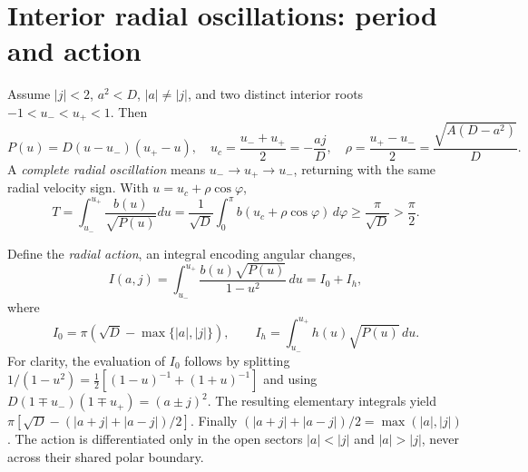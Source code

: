 \documentclass[11pt,a4paper]{article}
\theoremstyle{remark}\newtheorem{remark}[theorem]{Remark}
\begin{document}
\section{Interior radial oscillations: period and action}
Assume $|j|<2$, $a^2<D$, $|a|\ne|j|$, and two distinct interior roots $-1<u_-<u_+<1$. Then
\begin{equation}\label{eq:turning}
P(u)=D(u-u_-)(u_+-u),\quad u_c=\frac{u_-+u_+}{2}=-\frac{aj}{D},\quad \rho=\frac{u_+-u_-}{2}=\frac{\sqrt{A(D-a^2)}}{D}.
\end{equation}
A \emph{complete radial oscillation} means $u_-\to u_+\to u_-$, returning with the same radial velocity sign. With $u=u_c+\rho\cos\varphi$,
\begin{equation}\label{eq:period}
T=\int_{u_-}^{u_+}\frac{b(u)}{\sqrt{P(u)}}du
=\frac1{\sqrt D}\int_0^\pi b(u_c+\rho\cos\varphi)\,d\varphi
\ge\frac\pi{\sqrt D}>\frac\pi2.
\end{equation}

Define the \emph{radial action}, an integral encoding angular changes,
\begin{equation}\label{eq:action}
I(a,j)=\int_{u_-}^{u_+}\frac{b(u)\sqrt{P(u)}}{1-u^2}\,du=I_0+I_h,
\end{equation}
where
\begin{equation}\label{eq:actionparts}
I_0=\pi\left(\sqrt D-\max\{|a|,|j|\}\right),\qquad
I_h=\int_{u_-}^{u_+}h(u)\sqrt{P(u)}\,du.
\end{equation}
For clarity, the evaluation of $I_0$ follows by splitting $1/(1-u^2)=\tfrac12[(1-u)^{-1}+(1+u)^{-1}]$ and using $D(1\mp u_-)(1\mp u_+)=(a\pm j)^2$. The resulting elementary integrals yield $\pi[\sqrt D-(|a+j|+|a-j|)/2]$. Finally $(|a+j|+|a-j|)/2=\max(|a|,|j|)$. The action is differentiated only in the open sectors $|a|<|j|$ and $|a|>|j|$, never across their shared polar boundary.
\end{document}
